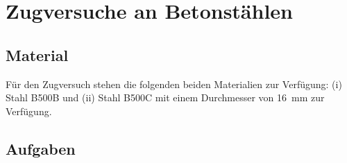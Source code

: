 %



\newcommand{\blattname}{Zugversuche an Betonstählen}



\section*{\blattname}



\subsection*{Material}

Für den Zugversuch stehen die folgenden beiden Materialien zur Verfügung: (i) Stahl B500B und (ii) Stahl B500C mit einem Durchmesser von \SI{16}{\mm} zur Verfügung.

\subsection*{Aufgaben}


